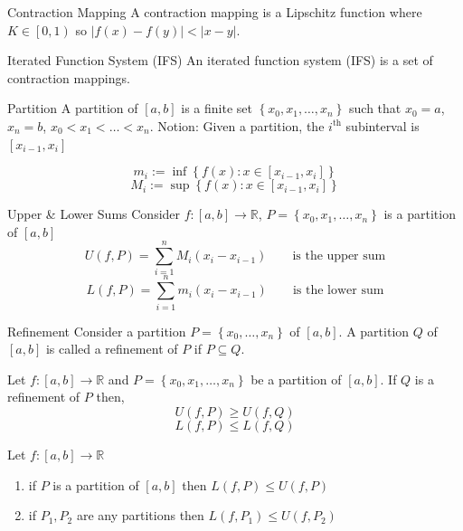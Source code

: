 \documentclass[12pt]{article}
\begin{document}
\begin{definition}{Contraction Mapping}{}
    A contraction mapping is a Lipschitz function where $ K \in \left[ 0, 1 \right) $ so $ \left| f \left( x \right) - f \left( y \right) \right| < \left| x - y \right| $.
\end{definition}
\begin{definition}{Iterated Function System (IFS)}{}
    An iterated function system (IFS) is a set of contraction mappings.
\end{definition}
\begin{definition}{Partition}{}
    A partition of $ \left[ a, b \right] $ is a finite set $ \left\{ x_0, x_1, \dots, x_n \right\} $ such that $ x_0 = a $, $ x_n = b $, $ x_0 < x_1 < \dots < x_n $.
    \medskip
    \newline
    Notion: Given a partition, the $ i^\text{th} $ subinterval is $ \left[ x_{i - 1}, x_i \right] $
\end{definition}
\begin{definition}{}{}
    \[ m_i := \inf \left\{ f \left( x \right) : x \in \left[ x_{i - 1}, x_i \right] \right\} \]
    \[ M_i := \sup \left\{ f \left( x \right) : x \in \left[ x_{i - 1}, x_i \right] \right\} \]
\end{definition}
\begin{definition}{Upper \& Lower Sums}{}
    Consider $ f : \left[ a, b \right] \to \mathbb{R} $, $ P = \left\{ x_0, x_1, \dots, x_n \right\} $ is a partition of $ \left[ a, b \right] $
    \[ U \left( f, P \right) = \sum_{i = 1}^n M_i \left( x_i - x_{i -1} \right) \qquad \text{is the upper sum} \]
    \[ L \left( f, P \right) = \sum_{i = 1}^n m_i \left( x_i - x_{i -1} \right) \qquad \text{is the lower sum} \]
\end{definition}
\begin{definition}{Refinement}{}
    Consider a partition $ P = \left\{ x_0, \dots, x_n \right\} $ of $ \left[ a, b \right] $. A partition $ Q $ of $ \left[ a, b \right] $ is called a refinement of $ P $ if $ P \subseteq Q $.
\end{definition}
\begin{proposition}{}{}
    Let $ f : \left[ a, b \right] \to \mathbb{R} $ and $ P = \left\{ x_0, x_1, \dots, x_n \right\} $ be a partition of $ \left[ a, b \right] $. If $ Q $ is a refinement of $ P $ then,
    \[ U \left( f, P \right) \geq U \left( f, Q \right) \]
    \[ L \left( f, P \right) \leq L \left( f, Q \right) \]
\end{proposition}
\begin{proposition}{}{}
    Let $ f : \left[ a, b \right] \to \mathbb{R} $
    \begin{enumerate}[label = (\alph*)]
        \item if $ P $ is a partition of $ \left[ a, b \right] $ then $ L \left( f, P \right) \leq U \left( f, P \right) $
        \item if $ P_1, P_2 $ are any partitions then $ L \left( f, P_1 \right) \leq U \left( f, P_2 \right) $
    \end{enumerate}
\end{proposition}
\end{document}
